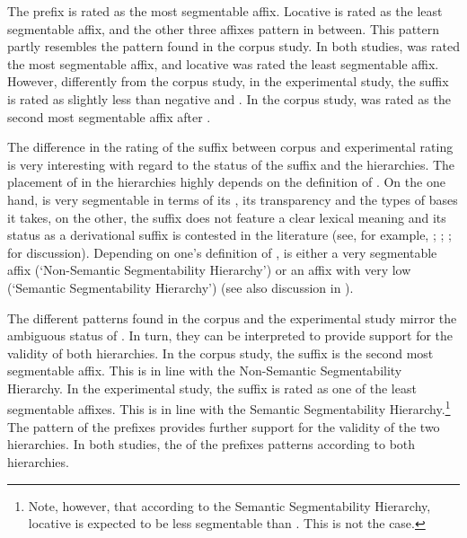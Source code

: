 The prefix  is rated as the most segmentable affix. 
 Locative  is rated as the least segmentable affix, and the other three affixes pattern in between. 
  This pattern partly resembles the pattern found in the corpus study. In both studies,  was rated the most segmentable affix, and locative  was rated the least segmentable affix. 
 However, differently from the corpus study, in the experimental study, the suffix  is rated as slightly less  than negative  and . In the corpus study,  was rated as the second most segmentable affix after .


The difference in the rating of the suffix  between corpus and experimental rating is very interesting with regard to the  status of the suffix and the  hierarchies. The placement of  in the  hierarchies highly depends on the definition of . On the one hand,  is very segmentable in terms of its , its transparency and the types of bases it takes, on the other, the suffix does not feature a clear lexical meaning and its status as a derivational suffix is contested in the literature (see, for example, \citealt{Zwicky.1995}; \citealt{Plag.2003}; \citealt{Giegerich.2012}; \citealt{Bauer.2013} for discussion). Depending on one's definition of ,  is either a very segmentable affix (`Non-Semantic Segmentability Hierarchy') or an affix with very low  (`Semantic Segmentability Hierarchy') (see also discussion in ). 

The different  patterns found in the corpus and the experimental study mirror the ambiguous  status of . In turn, they can be interpreted to provide support for the validity of both  hierarchies. 
In the corpus study, the suffix  is the second most segmentable affix. This is in line with the Non-Semantic Segmentability Hierarchy. 
In the experimental study, the suffix  is rated as one of the least segmentable affixes. This is in line with the Semantic Segmentability Hierarchy.\footnote{Note, however, that according to the Semantic Segmentability Hierarchy, locative  is expected to be less segmentable than . This is not the case. }
The  pattern of the prefixes provides further support for the validity of the two hierarchies. In both studies, the  of the prefixes patterns according to both hierarchies. 




